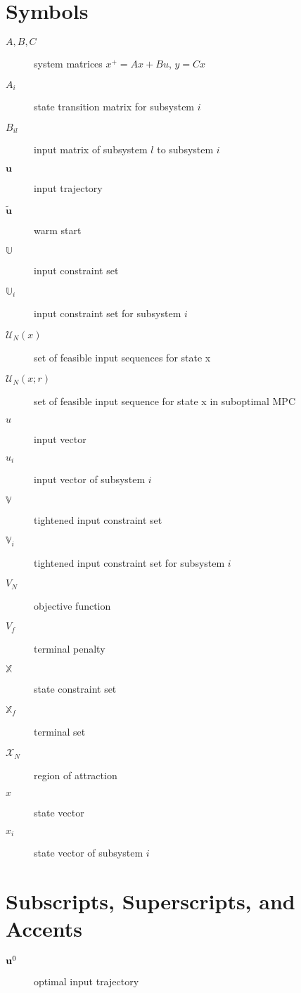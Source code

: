 
\begin{nomenclature}
\section*{Symbols}
\begin{description}
\item[$A,B,C$]   system matrices $x^+ = Ax + Bu$, $y = Cx$
\item[$A_i$] state transition matrix for subsystem $i$
\item[$B_{il}$] input matrix of subsystem $l$ to subsystem $i$
\item[$\mathbf{u}$] input trajectory
\item[$\tilde{\mathbf{u}}$] warm start
\item[$\mathbb{U}$] input constraint set
\item[$\mathbb{U}_i$] input constraint set for subsystem $i$
\item[$\mathcal{U}_N(x)$] set of feasible input sequences for state x
\item[$\mathcal{U}_N(x;r)$] set of feasible input sequence for state x
  in suboptimal MPC
\item[$u$] input vector
\item[$u_i$] input vector of subsystem $i$
\item[$\mathbb{V}$] tightened input constraint set
\item[$\mathbb{V}_i$] tightened input constraint set for subsystem $i$
\item[$V_N$] objective function
\item[$V_f$] terminal penalty
\item[$\mathbb{X}$] state constraint set 
\item[$\mathbb{X}_f$] terminal set
\item[$\mathcal{X}_N$] region of attraction
\item[$x$] state vector
\item[$x_i$] state vector of subsystem $i$



\end{description}
\section*{Subscripts, Superscripts, and Accents}
\begin{description}
\item[${\bf u}^0$] optimal input trajectory

\end{description}
\end{nomenclature}
